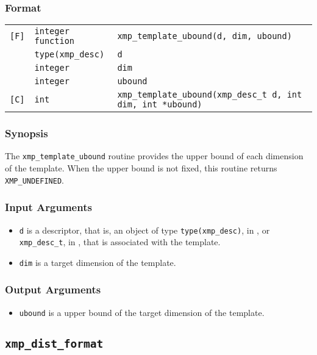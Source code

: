 \subsubsection*{Format}

\begin{tabular}{lll}

\verb![F]!& {\tt integer function}& {\tt xmp\_template\_ubound(d, dim, ubound)}\\
          & {\tt type(xmp\_desc)} & {\tt d}\\
          & {\tt integer} & {\tt dim}\\
          & {\tt integer} & {\tt ubound}\\

\verb![C]!&  {\tt int}& {\tt xmp\_template\_ubound(xmp\_desc\_t d, int dim, int *ubound)}\\

\end{tabular}

\subsubsection*{Synopsis}

The {\tt xmp\_template\_ubound} routine provides the upper bound of each dimension of the template.
  When the upper bound is not fixed, this routine returns {\tt XMP\_UNDEFINED}.

\subsubsection*{Input Arguments}
\begin{itemize}
 \item {\tt d} is a descriptor, that is, an object of type 
       {\tt type(xmp\_desc)}, in {\XMPF}, or {\tt xmp\_desc\_t},
       in {\XMPC}, that is associated with the template.
        \item {\tt dim} is a target dimension of the template.
\end{itemize}

\subsubsection*{Output Arguments}
\begin{itemize}
 \item {\tt ubound} is a upper bound of the target dimension of the template.
\end{itemize}


\subsection{\tt xmp\_dist\_format}

